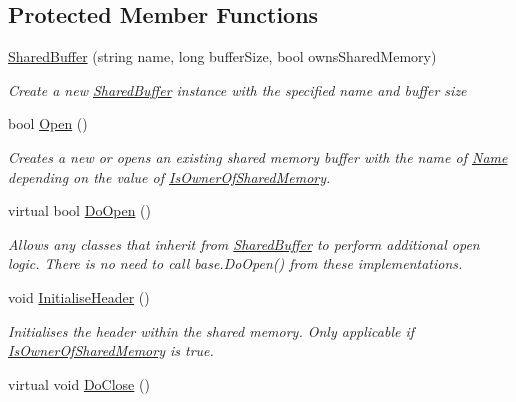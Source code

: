 \subsection*{Protected Member Functions}
\begin{DoxyCompactItemize}
\item 
\hyperlink{class_shared_memory_1_1_shared_buffer_adc3066fb64b6f7cfa2b6b50d8cf53b78}{Shared\+Buffer} (string name, long buffer\+Size, bool owns\+Shared\+Memory)
\begin{DoxyCompactList}\small\item\em Create a new \hyperlink{class_shared_memory_1_1_shared_buffer}{Shared\+Buffer} instance with the specified name and buffer size \end{DoxyCompactList}\item 
bool \hyperlink{class_shared_memory_1_1_shared_buffer_abf7e37d0b654ad76bcfca63543766445}{Open} ()
\begin{DoxyCompactList}\small\item\em Creates a new or opens an existing shared memory buffer with the name of \hyperlink{class_shared_memory_1_1_shared_buffer_ada2e0253ecaba264da7f2855a02e9ccc}{Name} depending on the value of \hyperlink{class_shared_memory_1_1_shared_buffer_a3cd1658c35b0a9234faf1e65eba5088e}{Is\+Owner\+Of\+Shared\+Memory}. \end{DoxyCompactList}\item 
virtual bool \hyperlink{class_shared_memory_1_1_shared_buffer_ae91f81f088cebf1bca375bfe0cb48d6e}{Do\+Open} ()
\begin{DoxyCompactList}\small\item\em Allows any classes that inherit from \hyperlink{class_shared_memory_1_1_shared_buffer}{Shared\+Buffer} to perform additional open logic. There is no need to call base.\+Do\+Open() from these implementations. \end{DoxyCompactList}\item 
void \hyperlink{class_shared_memory_1_1_shared_buffer_a13327700d0b6f45870c127f98f36d159}{Initialise\+Header} ()
\begin{DoxyCompactList}\small\item\em Initialises the header within the shared memory. Only applicable if \hyperlink{class_shared_memory_1_1_shared_buffer_a3cd1658c35b0a9234faf1e65eba5088e}{Is\+Owner\+Of\+Shared\+Memory} is true. \end{DoxyCompactList}\item 
virtual void \hyperlink{class_shared_memory_1_1_shared_buffer_a2137a67b3309712bc1e9a540c919f9bc}{Do\+Close} ()

\end{DoxyCompactItemize}
